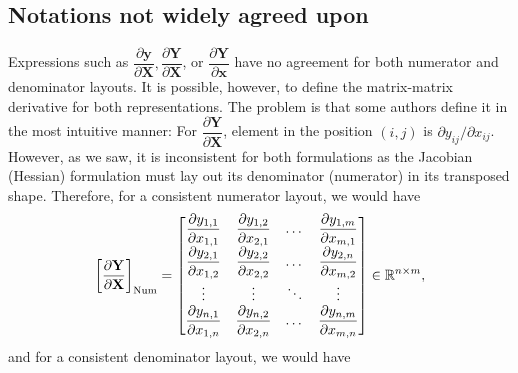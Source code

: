 \subsection{Notations not widely agreed upon}
\label{sub-sec:notations-not-agreed}
Expressions such as \(\dfrac{\partial \mathbf{y}}{\partial \mathbf{X}}, \dfrac{\partial \mathbf{Y}}{\partial \mathbf{X}}\), or \(\dfrac{\partial \mathbf{Y}}{\partial \mathbf{x}}\) have no agreement for both numerator and denominator layouts. It is possible, however, to define the matrix-matrix derivative for both representations. The problem is that some authors define it in the most intuitive manner: For \(\dfrac{\partial \mathbf{Y}}{\partial \mathbf{X}}\), element in the position \((i,j)\) is \(\partial y_{ij}/\partial x_{ij}\). However, as we saw, it is inconsistent for both formulations as the Jacobian (Hessian) formulation must lay out its denominator (numerator) in its transposed shape. Therefore, for a consistent numerator layout, we would have
\begin{align}
    \left[\frac{\partial \mathbf{Y}}{\partial\mathbf{X}}\right]_{\textnormal{Num}} = \begin{bmatrix}
        \dfrac{\partial y_{1,1}}{\partial x_{1,1}} & \dfrac{\partial y_{1,2}}{\partial x_{2,1}} & \dots & \dfrac{\partial y_{1,m}}{\partial x_{m,1}} \\
        \dfrac{\partial y_{2,1}}{\partial x_{1,2}} & \dfrac{\partial y_{2,2}}{\partial x_{2,2}} & \dots & \dfrac{\partial y_{2,n}}{\partial x_{m,2}} \\
        \vdots & \vdots & \ddots & \vdots \\
        \dfrac{\partial y_{n,1}}{\partial x_{1,n}} & \dfrac{\partial y_{n,2}}{\partial x_{2,n}} & \dots & \dfrac{\partial y_{n,m}}{\partial x_{m,n}} \\
    \end{bmatrix} \in \mathbb{R}^{n\times m},
\end{align}
and for a consistent denominator layout, we would have

